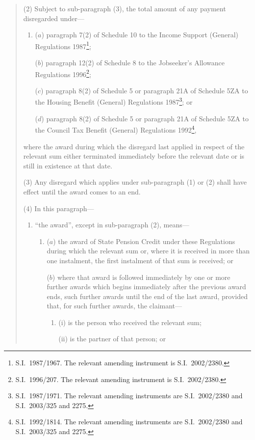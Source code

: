 \documentclass[12pt,a4paper]{article}
\begin{document}
\begin{enumerate}
\begin{quotation}
(2) Subject to sub-paragraph (3), the total amount of any payment disregarded under—
\begin{enumerate}\item[]
($a$) paragraph 7(2) of Schedule 10 to the Income Support (General) Regulations 1987\footnote{S.I.\ 1987/1967. The relevant amending instrument is S.I.\ 2002/2380.};

($b$) paragraph 12(2) of Schedule 8 to the Jobseeker’s Allowance Regulations 1996\footnote{S.I.\ 1996/207. The relevant amending instrument is S.I.\ 2002/2380.};

($c$) paragraph 8(2) of Schedule 5 or paragraph 21A of Schedule 5ZA to the Housing Benefit (General) Regulations 1987\footnote{S.I.\ 1987/1971. The relevant amending instruments are S.I.\ 2002/2380 and S.I.\ 2003/325 and 2275.}; or

($d$) paragraph 8(2) of Schedule 5 or paragraph 21A of Schedule 5ZA to the Council Tax Benefit (General) Regulations 1992\footnote{S.I.\ 1992/1814. The relevant amending instruments are S.I.\ 2002/2380 and S.I.\ 2003/325 and 2275.},
\end{enumerate}
where the award during which the disregard last applied in respect of the relevant sum either terminated immediately before the relevant date or is still in existence at that date.

(3) Any disregard which applies under sub-paragraph (1) or (2) shall have effect until the award comes to an end.

(4) In this paragraph—
\begin{enumerate}\item[]
    “the award”, except in sub-paragraph (2), means—
\begin{enumerate}\item[]
    ($a$) 
    the award of State Pension Credit under these Regulations during which the relevant sum or, where it is received in more than one instalment, the first instalment of that sum is received; or

    ($b$) 
    where that award is followed immediately by one or more further awards which begins immediately after the previous award ends, such further awards until the end of the last award, provided that, for such further awards, the claimant—
\begin{enumerate}\item[]
    (i) 
    is the person who received the relevant sum;

    (ii) 
    is the partner of that person; or


\end{enumerate}
\end{enumerate}
\end{enumerate}
\end{quotation}
\end{enumerate}
\end{document}

